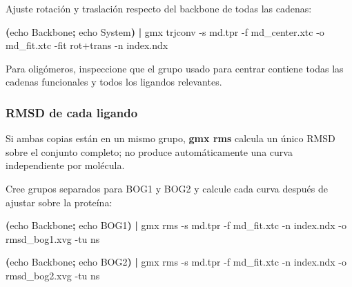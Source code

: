 \documentclass[
  spanish,
  11pt,
  a4paper]{article}
\newenvironment{Shaded}{\begin{snugshade}}{\end{snugshade}}
\newcommand{\AttributeTok}[1]{\textcolor[rgb]{0.13,0.29,0.53}{#1}}
\newcommand{\BuiltInTok}[1]{#1}
\newcommand{\ExtensionTok}[1]{#1}
\newcommand{\KeywordTok}[1]{\textcolor[rgb]{0.13,0.29,0.53}{\textbf{#1}}}
\newcommand{\NormalTok}[1]{#1}
\begin{document}
Ajuste rotación y traslación respecto del backbone de todas las cadenas:

\begin{Shaded}
\begin{Highlighting}[]
\KeywordTok{(}\BuiltInTok{echo}\NormalTok{ Backbone}\KeywordTok{;} \BuiltInTok{echo}\NormalTok{ System}\KeywordTok{)} \KeywordTok{|}
\ExtensionTok{gmx}\NormalTok{ trjconv     }\AttributeTok{{-}s}\NormalTok{ md.tpr     }\AttributeTok{{-}f}\NormalTok{ md\_center.xtc     }\AttributeTok{{-}o}\NormalTok{ md\_fit.xtc     }\AttributeTok{{-}fit}\NormalTok{ rot+trans     }\AttributeTok{{-}n}\NormalTok{ index.ndx}
\end{Highlighting}
\end{Shaded}

Para oligómeros, inspeccione que el grupo usado para centrar contiene
todas las cadenas funcionales y todos los ligandos relevantes.

\subsubsection{RMSD de cada ligando}\label{rmsd-de-cada-ligando}

Si ambas copias están en un mismo grupo, \textbf{gmx rms} calcula un
único RMSD sobre el conjunto completo; no produce automáticamente una
curva independiente por molécula.

Cree grupos separados para BOG1 y BOG2 y calcule cada curva después de
ajustar sobre la proteína:

\begin{Shaded}
\begin{Highlighting}[]
\KeywordTok{(}\BuiltInTok{echo}\NormalTok{ Backbone}\KeywordTok{;} \BuiltInTok{echo}\NormalTok{ BOG1}\KeywordTok{)} \KeywordTok{|}
\ExtensionTok{gmx}\NormalTok{ rms     }\AttributeTok{{-}s}\NormalTok{ md.tpr     }\AttributeTok{{-}f}\NormalTok{ md\_fit.xtc     }\AttributeTok{{-}n}\NormalTok{ index.ndx     }\AttributeTok{{-}o}\NormalTok{ rmsd\_bog1.xvg     }\AttributeTok{{-}tu}\NormalTok{ ns}

\KeywordTok{(}\BuiltInTok{echo}\NormalTok{ Backbone}\KeywordTok{;} \BuiltInTok{echo}\NormalTok{ BOG2}\KeywordTok{)} \KeywordTok{|}
\ExtensionTok{gmx}\NormalTok{ rms     }\AttributeTok{{-}s}\NormalTok{ md.tpr     }\AttributeTok{{-}f}\NormalTok{ md\_fit.xtc     }\AttributeTok{{-}n}\NormalTok{ index.ndx     }\AttributeTok{{-}o}\NormalTok{ rmsd\_bog2.xvg     }\AttributeTok{{-}tu}\NormalTok{ ns}
\end{Highlighting}
\end{Shaded}
\end{document}
